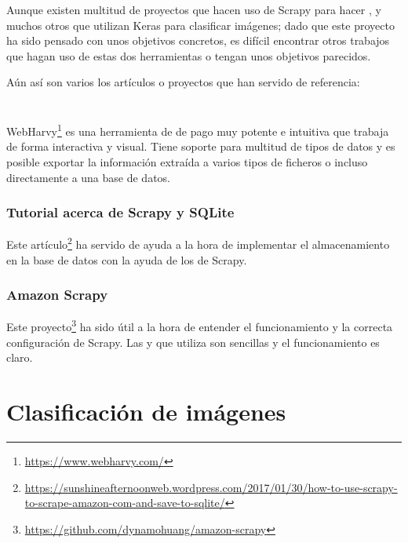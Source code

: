 
Aunque existen multitud de proyectos que hacen uso de Scrapy para hacer , y muchos otros que utilizan Keras para clasificar imágenes; dado que este proyecto ha sido pensado con unos objetivos concretos, es difícil encontrar otros trabajos que hagan uso de estas dos herramientas o tengan unos objetivos parecidos.

Aún así son varios los artículos o proyectos que han servido de referencia:

\section{}

\subsubsection{}
WebHarvy\footnote{\url{https://www.webharvy.com/}} es una herramienta de  de pago muy potente e intuitiva que trabaja de forma interactiva y visual. Tiene soporte para multitud de tipos de datos y es posible exportar la información extraída a varios tipos de ficheros o incluso directamente a una base de datos.

\subsubsection{Tutorial acerca de Scrapy y SQLite}
Este artículo\footnote{\url{https://sunshineafternoonweb.wordpress.com/2017/01/30/how-to-use-scrapy-to-scrape-amazon-com-and-save-to-sqlite/}} ha servido de ayuda a la hora de implementar el almacenamiento en la base de datos con la ayuda de los  de Scrapy.

\subsubsection{Amazon Scrapy}
Este proyecto\footnote{\url{https://github.com/dynamohuang/amazon-scrapy}} ha sido útil a la hora de entender el funcionamiento y la correcta configuración de Scrapy. Las  y  que utiliza son sencillas y el funcionamiento es claro.

\section{Clasificación de imágenes}

